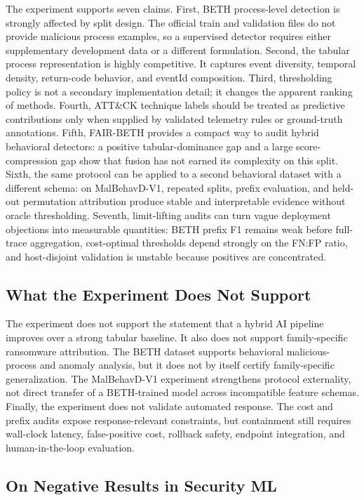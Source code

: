 \documentclass[journal]{IEEEtran}
\begin{document}
The experiment supports seven claims. First, BETH process-level detection is strongly affected by split design. The official train and validation files do not provide malicious process examples, so a supervised detector requires either supplementary development data or a different formulation. Second, the tabular process representation is highly competitive. It captures event diversity, temporal density, return-code behavior, and eventId composition. Third, thresholding policy is not a secondary implementation detail; it changes the apparent ranking of methods. Fourth, ATT\&CK technique labels should be treated as predictive contributions only when supplied by validated telemetry rules or ground-truth annotations. Fifth, FAIR-BETH provides a compact way to audit hybrid behavioral detectors: a positive tabular-dominance gap and a large score-compression gap show that fusion has not earned its complexity on this split. Sixth, the same protocol can be applied to a second behavioral dataset with a different schema: on MalBehavD-V1, repeated splits, prefix evaluation, and held-out permutation attribution produce stable and interpretable evidence without oracle thresholding. Seventh, limit-lifting audits can turn vague deployment objections into measurable quantities: BETH prefix F1 remains weak before full-trace aggregation, cost-optimal thresholds depend strongly on the FN:FP ratio, and host-disjoint validation is unstable because positives are concentrated.

\subsection{What the Experiment Does Not Support}

The experiment does not support the statement that a hybrid AI pipeline improves over a strong tabular baseline. It also does not support family-specific ransomware attribution. The BETH dataset supports behavioral malicious-process and anomaly analysis, but it does not by itself certify family-specific generalization. The MalBehavD-V1 experiment strengthens protocol externality, not direct transfer of a BETH-trained model across incompatible feature schemas. Finally, the experiment does not validate automated response. The cost and prefix audits expose response-relevant constraints, but containment still requires wall-clock latency, false-positive cost, rollback safety, endpoint integration, and human-in-the-loop evaluation.

\subsection{On Negative Results in Security ML}
\end{document}
